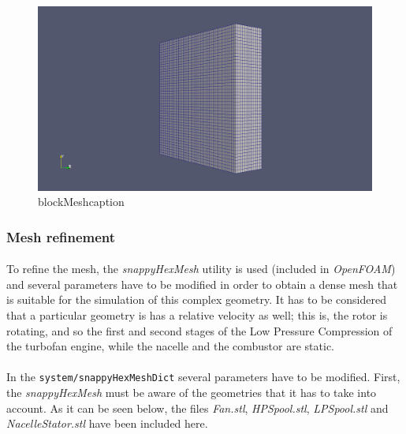 \begin{figure}[h!]
\includegraphics[scale=0.26]{./mesh/screenshots/blockmesh}
\centering
\caption{blockMeshcaption}
\label{blockMeshcaption}
\end{figure}

\subsubsection{Mesh refinement}

\paragraph{}To refine the mesh, the \textit{snappyHexMesh} utility is used (included in \textit{OpenFOAM}) and several parameters have to be modified in order to obtain a dense mesh that is suitable for the simulation of this complex geometry. It has to be considered that a particular geometry is has a relative velocity as well; this is, the rotor is rotating, and so the first and second stages of the Low Pressure Compression of the turbofan engine, while the nacelle and the combustor are static. 

\paragraph{}In the \texttt{system/snappyHexMeshDict} several parameters have to be modified. First, the \textit{snappyHexMesh} must be aware of the geometries that it has to take into account. As it can be seen below, the files \textit{Fan.stl}, \textit{HPSpool.stl}, \textit{LPSpool.stl} and \textit{NacelleStator.stl} have been included here.

